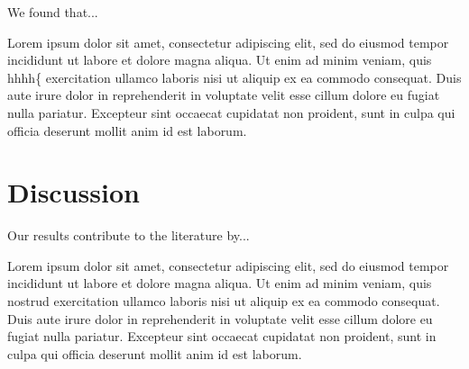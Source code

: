 \documentclass[jou, floatsintext, colorlinks=true, linkcolor=blue, citecolor=blue, urlcolor=blue]{apa7} %
\begin{document}
We found that...

Lorem ipsum dolor sit amet, consectetur adipiscing elit, sed do eiusmod tempor incididunt ut labore et dolore magna aliqua. Ut enim ad minim veniam, quis hhhh\{ exercitation ullamco laboris nisi ut aliquip ex ea commodo consequat. Duis aute irure dolor in reprehenderit in voluptate velit esse cillum dolore eu fugiat nulla pariatur. Excepteur sint occaecat cupidatat non proident, sunt in culpa qui officia deserunt mollit anim id est laborum.

\section{Discussion}

Our results contribute to the literature by...

Lorem ipsum dolor sit amet, consectetur adipiscing elit, sed do eiusmod tempor incididunt ut labore et dolore magna aliqua. Ut enim ad minim veniam, quis nostrud exercitation ullamco laboris nisi ut aliquip ex ea commodo consequat. Duis aute irure dolor in reprehenderit in voluptate velit esse cillum dolore eu fugiat nulla pariatur. Excepteur sint occaecat cupidatat non proident, sunt in culpa qui officia deserunt mollit anim id est laborum.

\printbibliography %
\end{document}
